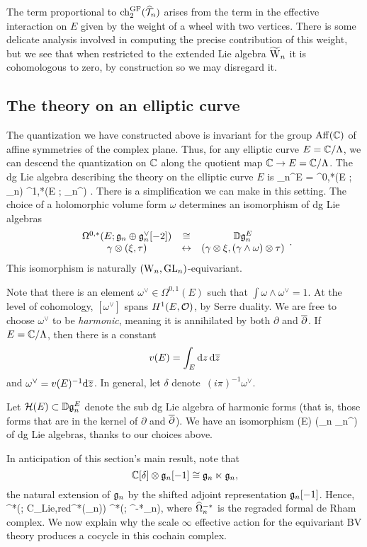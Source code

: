The term proportional to ${\rm ch}_2^{\rm GF}(\widehat{\mathcal T}_n)$ arises from the term in the effective interaction on $E$ given by the weight of a wheel with two vertices. 
There is some delicate analysis involved in computing the precise contribution of this weight, but we see that when restricted to the extended Lie algebra $\widetilde{{{\rm W}}}_n$ it is cohomologous to zero, by construction so we may disregard it. 

\subsection{The theory on an elliptic curve}

The quantization we have constructed above is invariant 
for the group ${\rm Aff}(\mathbb C)$ of affine symmetries of the complex plane. 
Thus, for any elliptic curve $E = \mathbb C/\Lambda$,
we can descend the quantization on $\mathbb C$ along the quotient map $\mathbb C \to E = \mathbb C / \Lambda$.
The dg Lie algebra describing the theory on the elliptic curve $E$ is
\ben
\DD \fg_n^E = \Omega^{0,*}(E ; \fg_n) \oplus \Omega^{1,*}(E ; \fg_n^\vee[-2]) .
\een 
There is a simplification we can make in this setting. 
The choice of a holomorphic volume form $\omega$ determines an isomorphism of dg Lie algebras
\[
\begin{array}{ccc}
\Omega^{0,*}(E; \mathfrak g_n \oplus \mathfrak g_n^\vee[-2]) &\cong & \mathbb D \mathfrak g_n^E\\
\gamma \otimes (\xi, \tau) & \leftrightarrow & (\gamma \otimes \xi,(\gamma \wedge \omega) \otimes \tau)
\end{array}.
\]
This isomorphism is naturally $({{\rm W}_n}, {\rm GL}_n)$-equivariant. 

Note that there is an element $\omega^\vee \in \Omega^{0,1}(E)$  such that $\int \omega \wedge \omega^\vee = 1$.
At the level of cohomology, $[\omega^\vee]$ spans $H^1(E,\mathcal O)$, by Serre duality.
We are free to choose $\omega^\vee$ to be {\em harmonic}, 
meaning it is annihilated by both $\partial$ and $\overline{\partial}$.
If $E = \mathbb C/\Lambda$, then there is a constant
\[
v(E) = \int_{E} {\rm d} z \, {\rm d}\overline{z}
\]
and $\omega^\vee = v(E)^{-1} {\rm d}\overline{z}$.
In general, let $\delta$ denote~$(i \pi)^{-1}\omega^\vee$.

Let $\mathcal{H}(E) \subset \mathbb D \mathfrak g_n^E$ denote the sub dg Lie algebra of harmonic forms 
(that is, those forms that are in the kernel of $\partial$ and $\overline{\partial}$).
We have an isomorphism 
\ben
\cH(E) \cong \CC [\delta] \tensor (\fg_n \oplus \fg_n^\vee[-2])
\een
of dg Lie algebras, thanks to our choices above.

In anticipation of this section's main result, note that 
\[
\mathbb C[\delta] \otimes \mathfrak g_n[-1] \cong \mathfrak{g}_n \ltimes \mathfrak{g}_n, 
\]
the natural extension of $\mathfrak{g}_n$ by the shifted adjoint representation $\mathfrak{g}_n[-1]$.
Hence,
\ben
\clie^*\left(\Vect ; {\rm C}_{\rm Lie,red}^*(\CC[\delta] \tensor \fg_n)\right)
\cong \clie^*(\Vect ; \hOmega^{-*}_n),
\een
where $\widehat{\Omega}^{-*}_n$ is the regraded formal de Rham complex. 
We now explain why the scale $\infty$ effective action for the equivariant BV theory
produces a cocycle in this cochain complex.

